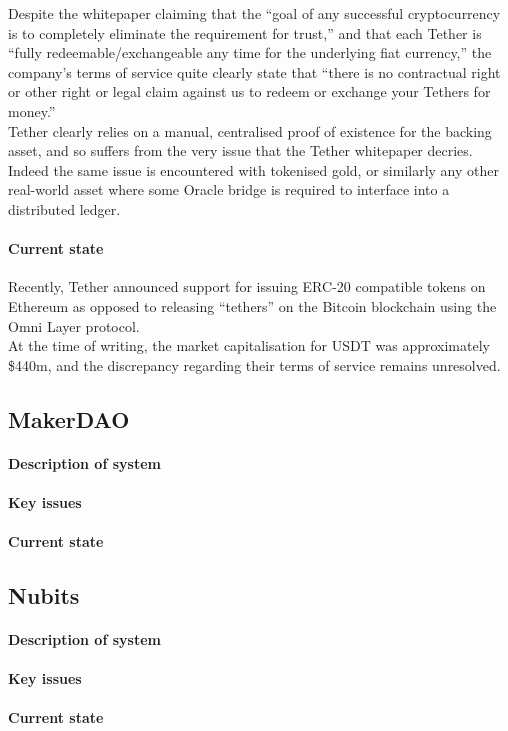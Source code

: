 Despite the whitepaper claiming that the ``goal of any successful cryptocurrency is to completely eliminate the requirement for trust,'' and that each Tether is ``fully redeemable/exchangeable any time for the underlying fiat currency,'' the company's terms of service quite clearly state that ``there is no contractual right or other right or legal claim against us to redeem or exchange your Tethers for money.'' \\

\noindent Tether clearly relies on a manual, centralised proof of existence for the backing asset, and so suffers from the very issue that the Tether whitepaper decries. Indeed the same issue is encountered with tokenised gold, or similarly any other real-world asset where some Oracle bridge is required to interface into a distributed ledger.

\paragraph{Current state}

Recently, Tether announced support for issuing ERC-20 compatible tokens on Ethereum as opposed to releasing ``tethers'' on the Bitcoin blockchain using the Omni Layer protocol. \\

\noindent At the time of writing, the market capitalisation for USDT was approximately \$440m, and the discrepancy regarding their terms of service remains unresolved. \\


\subsection{MakerDAO}
\paragraph{Description of system}

\paragraph{Key issues}

\paragraph{Current state}

\subsection{Nubits}

\paragraph{Description of system}

\paragraph{Key issues}

\paragraph{Current state}

\pagebreak